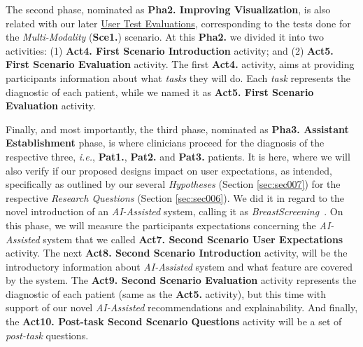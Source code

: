 \hfill

The second phase, nominated as \textbf{Pha2. Improving Visualization}, is also related with our later \href{https://github.com/MIMBCD-UI/prototype-breast-screening/wiki/User-Research#user-test-evaluations-}{User Test Evaluations}, corresponding to the tests done for the \textit{Multi-Modality} (\textbf{Sce1.}) scenario. At this \textbf{Pha2.} we divided it into two activities: (1) \textbf{Act4. First Scenario Introduction} activity; and (2) \textbf{Act5. First Scenario Evaluation} activity. The first \textbf{Act4.} activity, aims at providing participants information about what \textit{tasks} they will do. Each \textit{task} represents the diagnostic of each patient, while we named it as \textbf{Act5. First Scenario Evaluation} activity.

Finally, and most importantly, the third phase, nominated as \textbf{Pha3. Assistant Establishment} phase, is where clinicians proceed for the diagnosis of the respective three, \textit{i.e.}, \textbf{Pat1.}, \textbf{Pat2.} and \textbf{Pat3.} patients. It is here, where we will also verify if our proposed designs impact \cite{amershi2019guidelines, kocielnik2019will} on user expectations, as intended, specifically as outlined by our several \textit{Hypotheses} (Section \ref{sec:sec007}) for the respective \textit{Research Questions} (Section \ref{sec:sec006}). We did it in regard to the novel introduction of an \textit{AI-Assisted} system, calling it as \textit{BreastScreening}~\cite{calistobreastscreening}. On this phase, we will measure the participants expectations concerning the \textit{AI-Assisted} system that we called \textbf{Act7. Second Scenario User Expectations} activity. The next \textbf{Act8. Second Scenario Introduction} activity, will be the introductory information about \textit{AI-Assisted} system and what feature are covered by the system. The \textbf{Act9. Second Scenario Evaluation} activity represents the diagnostic of each patient (same as the \textbf{Act5.} activity), but this time with support of our novel \textit{AI-Assisted} recommendations and explainability. And finally, the \textbf{Act10. Post-task Second Scenario Questions} activity will be a set of \textit{post-task} questions.

